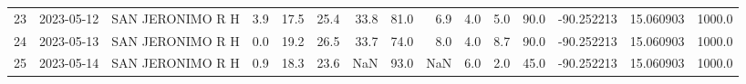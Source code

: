 \documentclass[12pt]{article}
\begin{document}
\begin{center}
\begin{tabular}{lllrrrrrrrrrrrr}
23  & 2023-05-12 &  SAN JERONIMO R H &     3.9 &  17.5 &   25.4 &  33.8 &     81.0 &        6.9 &  4.0 &         5.0 &        90.0 & -90.252213 &  15.060903 &   1000.0 \\
24  & 2023-05-13 &  SAN JERONIMO R H &     0.0 &  19.2 &   26.5 &  33.7 &     74.0 &        8.0 &  4.0 &         8.7 &        90.0 & -90.252213 &  15.060903 &   1000.0 \\
25  & 2023-05-14 &  SAN JERONIMO R H &     0.9 &  18.3 &   23.6 &   NaN &     93.0 &        NaN &  6.0 &         2.0 &        45.0 & -90.252213 &  15.060903 &   1000.0 \\
\bottomrule
\end{tabular}

        
        \end{center}
        
\end{document}
